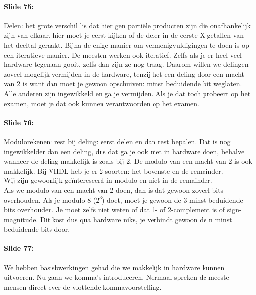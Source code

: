 \documentclass[10pt,a4paper]{book}
\begin{document}
\paragraph{Slide 75:} Delen: het grote verschil lis dat hier gen parti\"ele producten zijn die onafhankelijk zijn van elkaar, hier moet je eerst kijken of de deler in de eerste X getallen van het deeltal geraakt. Bijna de enige manier om vermenigvuldigingen te doen is op een iteratieve manier. De meesten werken ook iteratief. Zelfs als je er heel veel hardware tegenaan gooit, zelfs dan zijn ze nog traag. Daarom willen we delingen zoveel mogelijk vermijden in de hardware, tenzij het een deling door een macht van 2 is want dan moet je gewoon opschuiven: minst beduidende bit weglaten. Alle anderen zijn ingewikkeld en ga je vermijden. Als je dat toch probeert op het examen, moet je dat ook kunnen verantwoorden op het examen.

\paragraph{Slide 76:} Modulorekenen: rest bij deling: eerst delen en dan rest bepalen. Dat is nog ingewikkelder dan een deling, dus dat ga je ook niet in hardware doen, behalve wanneer de deling makkelijk is zoals bij 2. De modulo van een macht van 2 is ook makkelijk. Bij VHDL heb je er 2 soorten: het bovenste en de remainder.\\
Wij zijn gewoonlijk ge\"intereseerd in modulo en niet in de remainder.\\
Als we modulo van een macht van 2 doen, dan is dat gewoon zoveel bits overhouden. Als je modulo 8 ($2^3$) doet, moet je gewoon de 3 minst beduidende bits overhouden. Je moet zelfs niet weten of dat 1- of 2-complement is of sign-magnitude. Dit kost dus qua hardware niks, je verbindt gewoon de n minst beduidende bits door.

\paragraph{Slide 77:} We hebben basisbwerkingen gehad die we makkelijk in hardware kunnen uitvoeren. Nu gaan we komma's introduceren. Normaal spreken de meeste mensen direct over de vlottende kommavoorstelling. 
\end{document}

